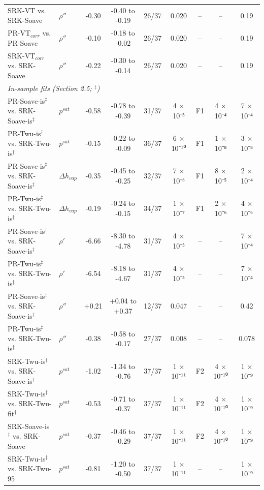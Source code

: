 \begin{table}[H]
\begin{tabular}{llccccccc}
SRK-VT vs. SRK-Soave & $\rho''$ & -0.30 & -0.40 to -0.19 & 26/37 & 0.020 & -- & -- & 0.19 \\
PR-VT$_{corr}$ vs. PR-Soave & $\rho''$ & -0.10 & -0.18 to -0.02 & 26/37 & 0.020 & -- & -- & 0.19 \\
SRK-VT$_{corr}$ vs. SRK-Soave & $\rho''$ & -0.22 & -0.30 to -0.14 & 26/37 & 0.020 & -- & -- & 0.19 \\
\multicolumn{9}{l}{\emph{In-sample fits (Section 2.5; $^{\ddagger}$)}} \\
PR-Soave-is$^{\ddagger}$ vs. SRK-Soave-is$^{\ddagger}$ & $p^{sat}$ & -0.58 & -0.78 to -0.39 & 31/37 & 4 × 10⁻⁵ & F1 & 4 × 10⁻⁴ & 7 × 10⁻⁴ \\
PR-Twu-is$^{\ddagger}$ vs. SRK-Twu-is$^{\ddagger}$ & $p^{sat}$ & -0.15 & -0.22 to -0.09 & 36/37 & 6 × 10⁻¹⁰ & F1 & 1 × 10⁻⁸ & 3 × 10⁻⁸ \\
PR-Soave-is$^{\ddagger}$ vs. SRK-Soave-is$^{\ddagger}$ & $\Delta h_{vap}$ & -0.35 & -0.45 to -0.25 & 32/37 & 7 × 10⁻⁶ & F1 & 8 × 10⁻⁵ & 2 × 10⁻⁴ \\
PR-Twu-is$^{\ddagger}$ vs. SRK-Twu-is$^{\ddagger}$ & $\Delta h_{vap}$ & -0.19 & -0.24 to -0.15 & 34/37 & 1 × 10⁻⁷ & F1 & 2 × 10⁻⁶ & 4 × 10⁻⁶ \\
PR-Soave-is$^{\ddagger}$ vs. SRK-Soave-is$^{\ddagger}$ & $\rho'$ & -6.66 & -8.30 to -4.78 & 31/37 & 4 × 10⁻⁵ & -- & -- & 7 × 10⁻⁴ \\
PR-Twu-is$^{\ddagger}$ vs. SRK-Twu-is$^{\ddagger}$ & $\rho'$ & -6.54 & -8.18 to -4.67 & 31/37 & 4 × 10⁻⁵ & -- & -- & 7 × 10⁻⁴ \\
PR-Soave-is$^{\ddagger}$ vs. SRK-Soave-is$^{\ddagger}$ & $\rho''$ & +0.21 & +0.04 to +0.37 & 12/37 & 0.047 & -- & -- & 0.42 \\
PR-Twu-is$^{\ddagger}$ vs. SRK-Twu-is$^{\ddagger}$ & $\rho''$ & -0.38 & -0.58 to -0.17 & 27/37 & 0.008 & -- & -- & 0.078 \\
SRK-Twu-is$^{\ddagger}$ vs. SRK-Soave-is$^{\ddagger}$ & $p^{sat}$ & -1.02 & -1.34 to -0.76 & 37/37 & 1 × 10⁻¹¹ & F2 & 4 × 10⁻¹⁰ & 1 × 10⁻⁹ \\
SRK-Twu-is$^{\ddagger}$ vs. SRK-Twu-fit$^{\dagger}$ & $p^{sat}$ & -0.53 & -0.71 to -0.37 & 37/37 & 1 × 10⁻¹¹ & F2 & 4 × 10⁻¹⁰ & 1 × 10⁻⁹ \\
SRK-Soave-is$^{\ddagger}$ vs. SRK-Soave & $p^{sat}$ & -0.37 & -0.46 to -0.29 & 37/37 & 1 × 10⁻¹¹ & F2 & 4 × 10⁻¹⁰ & 1 × 10⁻⁹ \\
SRK-Twu-is$^{\ddagger}$ vs. SRK-Twu-95 & $p^{sat}$ & -0.81 & -1.20 to -0.50 & 37/37 & 1 × 10⁻¹¹ & -- & -- & 1 × 10⁻⁹ \\

\end{tabular}
\end{table}
